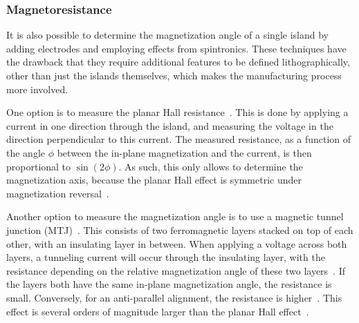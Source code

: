 \documentclass[11pt,a4paper,english,twoside]{article}
\begin{document}
\subsubsection{Magnetoresistance}
It is also possible to determine the magnetization angle of a single island by adding electrodes and employing effects from spintronics. These techniques have the drawback that they require additional features to be defined lithographically, other than just the islands themselves, which makes the manufacturing process more involved. \par
One option is to measure the planar Hall resistance~\cite{DAS-20}. This is done by applying a current in one direction through the island, and measuring the voltage in the direction perpendicular to this current. The measured resistance, as a function of the angle $\phi$ between the in-plane magnetization and the current, is then proportional to $\sin(2\phi)$. As such, this only allows to determine the magnetization axis, because the planar Hall effect is symmetric under magnetization reversal~\cite{DAS-20}. \par
Another option to measure the magnetization angle is to use a magnetic tunnel junction (MTJ)~\cite{syllabus_PoAEaPD}. This consists of two ferromagnetic layers stacked on top of each other, with an insulating layer in between. When applying a voltage across both layers, a tunneling current will occur through the insulating layer, with the resistance depending on the relative magnetization angle of these two layers~\cite{OnChipMTJ}. If the layers both have the same in-plane magnetization angle, the resistance is small. Conversely, for an anti-parallel alignment, the resistance is higher~\cite{syllabus_PoAEaPD}. This effect is several orders of magnitude larger than the planar Hall effect~\cite{DAS-20}.


\cleardoublepage
\end{document}
